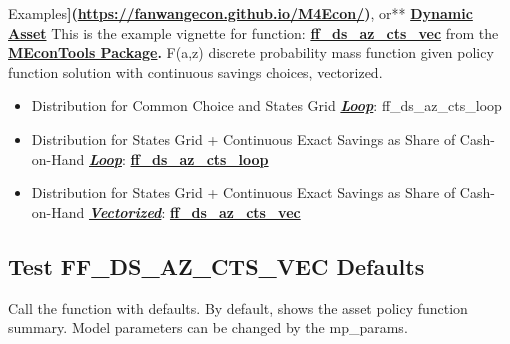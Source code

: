 \documentclass[
]{book}
\begin{document}
Examples\textbf{{]}(\url{https://fanwangecon.github.io/M4Econ/})}, or** \href{https://fanwangecon.github.io/CodeDynaAsset/}{\textbf{Dynamic
Asset}}
This is the example vignette for function:
\href{https://github.com/FanWangEcon/MEconTools/blob/master/MEconTools/vfi/ff_ds_az_cts_vec.m}{\textbf{ff\_ds\_az\_cts\_vec}}
from the \href{https://fanwangecon.github.io/MEconTools/}{\textbf{MEconTools
Package}}\textbf{.} F(a,z)
discrete probability mass function given policy function solution with
continuous savings choices, vectorized.

\begin{itemize}
\item
  Distribution for Common Choice and States Grid \underline{\textbf{\emph{Loop}}}:
  ff\_ds\_az\_cts\_loop
\item
  Distribution for States Grid + Continuous Exact Savings as Share of
  Cash-on-Hand \underline{\textbf{\emph{Loop}}}:
  \href{https://github.com/FanWangEcon/MEconTools/blob/master/MEconTools/vfi/ff_ds_az_cts_loop.m}{\textbf{ff\_ds\_az\_cts\_loop}}
\item
  Distribution for States Grid + Continuous Exact Savings as Share of
  Cash-on-Hand \underline{\textbf{\emph{Vectorized}}}:
  \href{https://github.com/FanWangEcon/MEconTools/blob/master/MEconTools/vfi/ff_ds_az_cts_vec.m}{\textbf{ff\_ds\_az\_cts\_vec}}
\end{itemize}

\hypertarget{test-ff_ds_az_cts_vec-defaults}{%
\subsection{Test FF\_DS\_AZ\_CTS\_VEC Defaults}\label{test-ff_ds_az_cts_vec-defaults}}

Call the function with defaults. By default, shows the asset policy
function summary. Model parameters can be changed by the mp\_params.
\end{document}
